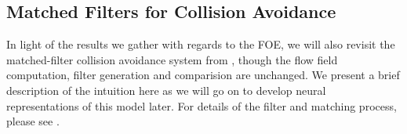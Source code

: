 \documentclass[a4paper,11pt,twoside,openright]{article}
\begin{document}






%

\subsection{Matched Filters for Collision Avoidance}\label{sec:offbg}
In light of the results we gather with regards to the FOE, we will
also revisit the matched-filter collision avoidance system from
\cite{Mitchell2018}, though the flow field computation, filter
generation and comparision are unchanged. We present a brief
description of the intuition here as we will go on to develop neural
representations of this model later. For details of the filter and
matching process, please see \cite{Mitchell2018}.
\newline\par
\end{document}
